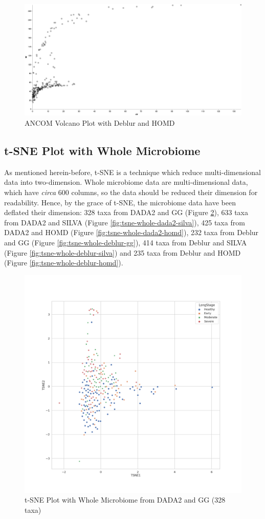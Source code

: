 \documentclass[a4paper]{article}
\begin{document}
            \begin{figure}[p]
                \centering
                \includegraphics[width=0.8 \linewidth]{figures/ANCOM/Deblur.homd.png}
                \caption{ANCOM Volcano Plot with Deblur and HOMD}
                \label{fig:volcano-deblur-homd}
            \end{figure}

        \subsection{t-SNE Plot with Whole Microbiome}
            As mentioned herein-before, t-SNE is a technique which reduce multi-dimensional data into two-dimension. Whole microbiome data are multi-dimensional data, which have \textit{circa} 600 columns, so the data should be reduced their dimension for readability. Hence, by the grace of t-SNE, the microbiome data have been deflated their dimension: 328 taxa from DADA2 and GG (Figure \ref{fig:tsne-whole-dada2-gg}), 633 taxa from DADA2 and SILVA (Figure \ref{fig:tsne-whole-dada2-silva}), 425 taxa from DADA2 and HOMD (Figure \ref{fig:tsne-whole-dada2-homd}), 232 taxa from Deblur and GG (Figure \ref{fig:tsne-whole-deblur-gg}), 414 taxa from Deblur and SILVA (Figure \ref{fig:tsne-whole-deblur-silva}) and 235 taxa from Deblur and HOMD (Figure \ref{fig:tsne-whole-deblur-homd}).

            \begin{figure}[p]
                \centering
                \includegraphics[width=0.6 \linewidth]{figures/tSNE/Whole/whole.DADA2.gg.png}
                \caption{t-SNE Plot with Whole Microbiome from DADA2 and GG (328 taxa)}
                \label{fig:tsne-whole-dada2-gg}
            \end{figure}
\end{document}
